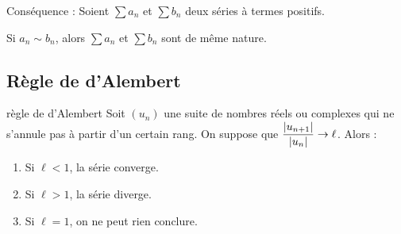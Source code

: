 Conséquence : Soient $\sum a_n$ et $\sum b_n$ deux séries à termes positifs.

Si $a_n \sim b_n$, alors $\sum a_n$ et $\sum b_n$ sont de même nature.

\subsection{Règle de d'Alembert }

\begin{theoreme}{règle de d'Alembert}{}
    Soit $(u_n)$ une suite de nombres réels ou complexes qui ne s'annule pas 
    à partir d'un certain rang. On suppose que $\displaystyle \frac{|u_{n + 1}|}{|u_n|} \to \ell$.
    Alors : 
    
    \begin{enumerate}
        \item Si $\ell < 1$, la série converge.
        \item Si $\ell > 1$, la série diverge.
        \item Si $\ell = 1$, on ne peut rien conclure.
    \end{enumerate}
\end{theoreme}



